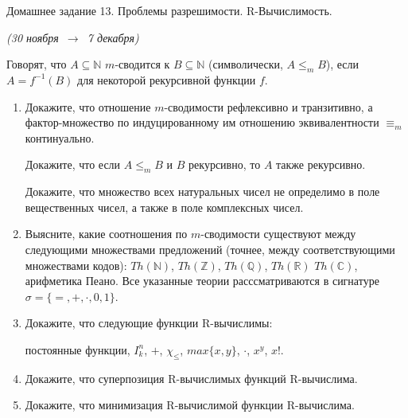 \documentclass[a4paper,11pt]{article}
\begin{document}
   \newcommand{\enumsep}{\vspace{-2.8mm}
   		\begin{enumerate}[itemsep=0.4mm,leftmargin=2.5mm]}

\begin{center}
	{\Large Домашнее задание 13. Проблемы разрешимости. R-Вычислимость.}

	{\it (30 ноября\ \(\to\)\ 7 декабря)}
\end{center}

Говорят, что $A\subseteq\mathbb{N}$ $m$-сводится к $B\subseteq\mathbb{N}$ (символически, $A\leq_mB$), если  $A=f^{-1}(B)$ для некоторой рекурсивной функции $f$.

\begin{enumerate}

\item Докажите, что отношение $m$-сводимости рефлексивно и транзитивно, а фактор-множество по индуцированному им отношению эквивалентности $\equiv_m$ континуально.

Докажите, что если $A\leq_mB$ и $B$ рекурсивно, то $A$ также рекурсивно.

Докажите, что  множество всех натуральных чисел не определимо в поле вещественных чисел, а также в поле комплексных чисел. 

\item Выясните, какие соотношения по $m$-сводимости существуют между следующими множествами предложений (точнее, между соответствующими множествами кодов): $Th(\mathbb{N})$, $Th(\mathbb{Z})$, $Th(\mathbb{Q})$,  $Th(\mathbb{R})$  $Th(\mathbb{C})$, арифметика Пеано. Все указанные теории расссматриваются в сигнатуре $\sigma=\{=,+,\cdot,0,1\}$.  

\item Докажите, что следующие функции R-вычислимы: 

постоянные функции, $I^n_k$, $+$, $\chi_\leq$, $max\{x,y\}$, $\cdot$, $x^y$, $x!$. 

\item Докажите, что суперпозиция R-вычислимых  функций R-вычислима.

\item Докажите, что минимизация R-вычислимой функции R-вычислима.

\end{enumerate}
\end{document}
